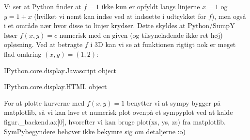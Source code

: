 \documentclass[letterpaper,10pt,english]{jupyterBook}
\begin{document}
Vi ser at Python finder at \(f=1\) ikke kun er opfyldt langs linjerne \(x = 1\) og \(y=1+x\) (hvilket vi nemt kan indse ved at indsætte i udtrykket for \(f\)), men også i et område nær hvor disse to linjer krydser. Dette skyldes at Python/SumpY løser \(f(x,y)=c\) numerisk med en given (og tilsyneladende ikke ret høj) opløsning. Ved at betragte \(f\) i 3D kan vi se at funktionen rigtigt nok er meget flad omkring \((x,y)=(1,2)\):

\begin{sphinxVerbatim}[commandchars=\\\{\}]
        
\end{sphinxVerbatim}

\begin{sphinxVerbatim}[commandchars=\\\{\}]
\PYGZlt{}IPython.core.display.Javascript object\PYGZgt{}
\end{sphinxVerbatim}

\begin{sphinxVerbatim}[commandchars=\\\{\}]
\PYGZlt{}IPython.core.display.HTML object\PYGZgt{}
\end{sphinxVerbatim}

For at plotte kurverne med \(f(x,y) = 1\) benytter vi at sympy bygger på matplotlib, så vi kan lave et numerisk plot ovenpå et sympy\sphinxhyphen{}plot ved at kalde figur.\_backend.ax{[}0{]}, hvorefter vi kan bruge plot(xs, ys, zs) fra matplotlib. SymPy\sphinxhyphen{}begyndere behøver ikke bekymre sig om detaljerne :o)
\end{document}
